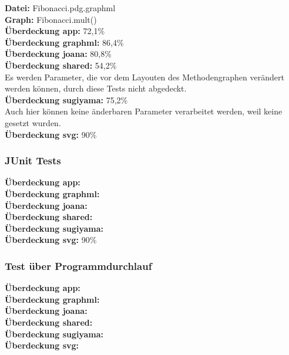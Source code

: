 \textbf{Datei: }Fibonacci.pdg.graphml\\
\textbf{Graph: }Fibonacci.mult()\\
\textbf{Überdeckung app: }72,1\%\\
\textbf{Überdeckung graphml: }86,4\%\\
\textbf{Überdeckung joana: }80,8\%\\
\textbf{Überdeckung shared: }54,2\%\\
Es werden Parameter, die vor dem Layouten des Methodengraphen verändert werden können, durch diese Tests nicht abgedeckt.\\
\textbf{Überdeckung sugiyama: }75,2\%\\
Auch hier können keine änderbaren Parameter verarbeitet werden, weil keine gesetzt wurden.\\
\textbf{Überdeckung svg: }90\%\\
\subsubsection{JUnit Tests}

\textbf{Überdeckung app: }\\
\textbf{Überdeckung graphml: }\\
\textbf{Überdeckung joana: }\\
\textbf{Überdeckung shared: }\\
\textbf{Überdeckung sugiyama: }\\
\textbf{Überdeckung svg: }90\%\\

\subsubsection{Test über Programmdurchlauf}

\textbf{Überdeckung app: }\\
\textbf{Überdeckung graphml: }\\
\textbf{Überdeckung joana: }\\
\textbf{Überdeckung shared: }\\
\textbf{Überdeckung sugiyama: }\\
\textbf{Überdeckung svg: }\\

